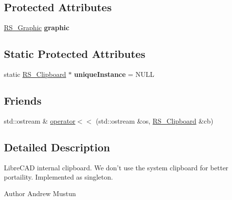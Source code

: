 \subsection*{Protected Attributes}
\begin{DoxyCompactItemize}
\item 
\hypertarget{classRS__Clipboard_a61250e2990ed7482e27a234bad1f78db}{\hyperlink{classRS__Graphic}{R\-S\-\_\-\-Graphic} {\bfseries graphic}}\label{classRS__Clipboard_a61250e2990ed7482e27a234bad1f78db}

\end{DoxyCompactItemize}
\subsection*{Static Protected Attributes}
\begin{DoxyCompactItemize}
\item 
\hypertarget{classRS__Clipboard_aaf1a6fd47e44d5932b103c678111d1ce}{static \hyperlink{classRS__Clipboard}{R\-S\-\_\-\-Clipboard} $\ast$ {\bfseries unique\-Instance} = N\-U\-L\-L}\label{classRS__Clipboard_aaf1a6fd47e44d5932b103c678111d1ce}

\end{DoxyCompactItemize}
\subsection*{Friends}
\begin{DoxyCompactItemize}
\item 
std\-::ostream \& \hyperlink{classRS__Clipboard_af4dd2d7eeee2db4ab5cf667ce31cb731}{operator$<$$<$} (std\-::ostream \&os, \hyperlink{classRS__Clipboard}{R\-S\-\_\-\-Clipboard} \&cb)
\end{DoxyCompactItemize}


\subsection{Detailed Description}
Libre\-C\-A\-D internal clipboard. We don't use the system clipboard for better portaility. Implemented as singleton.

\begin{DoxyAuthor}{Author}
Andrew Mustun 
\end{DoxyAuthor}


